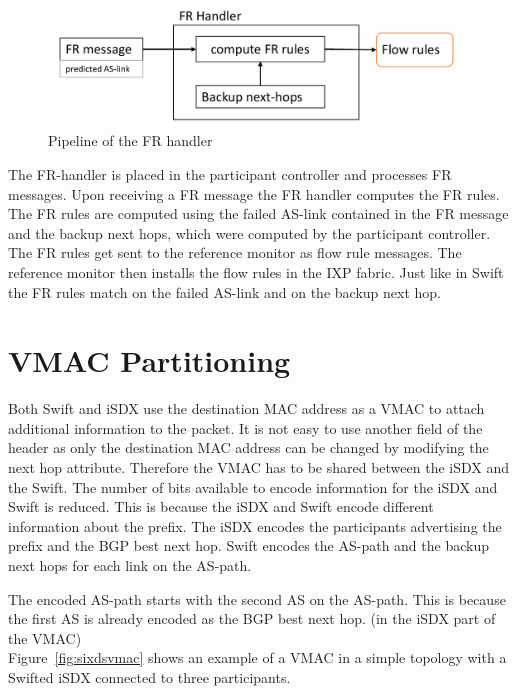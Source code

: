 \begin{figure}[h]
\center
\includegraphics[scale = 0.6]{Figures/design_fr_handler_cropped.pdf}
\caption{Pipeline of the FR handler}
\end{figure}

The FR-handler is placed in the participant controller and processes FR messages.
Upon receiving a FR message the FR handler computes the FR rules. The FR rules are computed using the failed AS-link contained in the FR message and the backup next hops, which were computed by the participant controller. 
The FR rules get sent to the reference monitor as flow rule messages. The reference monitor then installs the flow rules in the IXP fabric. Just like in Swift the FR rules match on the failed AS-link and on the backup next hop.    

\newpage

\section{\label{chapter4:vmac_partitioning}VMAC Partitioning}

Both Swift and iSDX use the destination MAC address as a VMAC to attach additional information to the packet. It is not easy to use another field of the header as only the destination MAC address can be changed by modifying the next hop attribute. Therefore the VMAC has to be shared between the iSDX and the Swift. The number of bits available to encode information for the iSDX and Swift is reduced. This is because the iSDX and Swift encode different \\information about the prefix. The iSDX encodes the participants advertising the prefix and the BGP best next hop. Swift encodes the AS-path and the backup next hops for each link on the AS-path.

The encoded AS-path starts with the second AS on the AS-path. This is because the first AS is already encoded as the BGP best next hop. (in the iSDX part of the VMAC)\\
Figure~\ref{fig:sixdsvmac} shows an example of a VMAC in a simple topology with a Swifted iSDX connected to three participants. 

